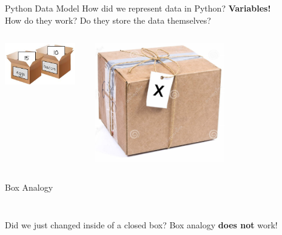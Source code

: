     \begin{frame}{Python Data Model}
        \LARGE
        How did we represent data in Python?
         \textbf{Variables!}\\
        How do they work?
         Do they store the data themselves?
        \begin{columns}
            \begin{column}{0.5\textwidth}
                \includegraphics[width=0.9\textwidth]{../Lecture6/images/box.jpg}
            \end{column}
            \begin{column}{0.5\textwidth}
                \includegraphics[width=0.6\textwidth]{../Lecture6/images/box_tag.jpg}
            \end{column}
        \end{columns}
    \end{frame}

    \begin{frame}{Box Analogy}
        \LARGE
        \inputminted[frame=single,framesep=2pt,lastline=4]{python3}{../Lecture6/code-examples/box_counter_ex.py}
        \inputminted[frame=single,framesep=2pt,firstline=6]{python3}{../Lecture6/code-examples/box_counter_ex.py}
        Did we just changed inside of a closed box?
         Box analogy \textbf{does not} work!
    \end{frame}

